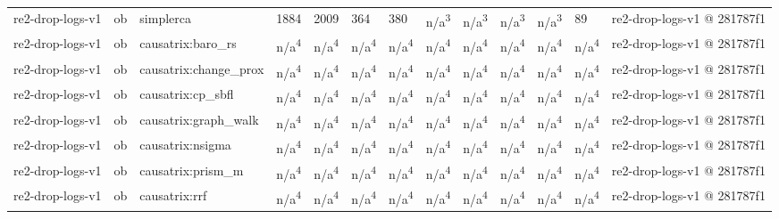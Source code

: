 \begin{table}[t]
\begin{tabular}{lllllllllllll}
re2-drop-logs-v1 & ob & simplerca & 1884 & 2009 & 364 & 380 & n/a\textsuperscript{3} & n/a\textsuperscript{3} & n/a\textsuperscript{3} & n/a\textsuperscript{3} & 89 & re2-drop-logs-v1 @ 281787f1 \\
re2-drop-logs-v1 & ob & causatrix:baro\_rs & n/a\textsuperscript{4} & n/a\textsuperscript{4} & n/a\textsuperscript{4} & n/a\textsuperscript{4} & n/a\textsuperscript{4} & n/a\textsuperscript{4} & n/a\textsuperscript{4} & n/a\textsuperscript{4} & n/a\textsuperscript{4} & re2-drop-logs-v1 @ 281787f1 \\
re2-drop-logs-v1 & ob & causatrix:change\_prox & n/a\textsuperscript{4} & n/a\textsuperscript{4} & n/a\textsuperscript{4} & n/a\textsuperscript{4} & n/a\textsuperscript{4} & n/a\textsuperscript{4} & n/a\textsuperscript{4} & n/a\textsuperscript{4} & n/a\textsuperscript{4} & re2-drop-logs-v1 @ 281787f1 \\
re2-drop-logs-v1 & ob & causatrix:cp\_sbfl & n/a\textsuperscript{4} & n/a\textsuperscript{4} & n/a\textsuperscript{4} & n/a\textsuperscript{4} & n/a\textsuperscript{4} & n/a\textsuperscript{4} & n/a\textsuperscript{4} & n/a\textsuperscript{4} & n/a\textsuperscript{4} & re2-drop-logs-v1 @ 281787f1 \\
re2-drop-logs-v1 & ob & causatrix:graph\_walk & n/a\textsuperscript{4} & n/a\textsuperscript{4} & n/a\textsuperscript{4} & n/a\textsuperscript{4} & n/a\textsuperscript{4} & n/a\textsuperscript{4} & n/a\textsuperscript{4} & n/a\textsuperscript{4} & n/a\textsuperscript{4} & re2-drop-logs-v1 @ 281787f1 \\
re2-drop-logs-v1 & ob & causatrix:nsigma & n/a\textsuperscript{4} & n/a\textsuperscript{4} & n/a\textsuperscript{4} & n/a\textsuperscript{4} & n/a\textsuperscript{4} & n/a\textsuperscript{4} & n/a\textsuperscript{4} & n/a\textsuperscript{4} & n/a\textsuperscript{4} & re2-drop-logs-v1 @ 281787f1 \\
re2-drop-logs-v1 & ob & causatrix:prism\_m & n/a\textsuperscript{4} & n/a\textsuperscript{4} & n/a\textsuperscript{4} & n/a\textsuperscript{4} & n/a\textsuperscript{4} & n/a\textsuperscript{4} & n/a\textsuperscript{4} & n/a\textsuperscript{4} & n/a\textsuperscript{4} & re2-drop-logs-v1 @ 281787f1 \\
re2-drop-logs-v1 & ob & causatrix:rrf & n/a\textsuperscript{4} & n/a\textsuperscript{4} & n/a\textsuperscript{4} & n/a\textsuperscript{4} & n/a\textsuperscript{4} & n/a\textsuperscript{4} & n/a\textsuperscript{4} & n/a\textsuperscript{4} & n/a\textsuperscript{4} & re2-drop-logs-v1 @ 281787f1 \\

\end{tabular}
\end{table}
